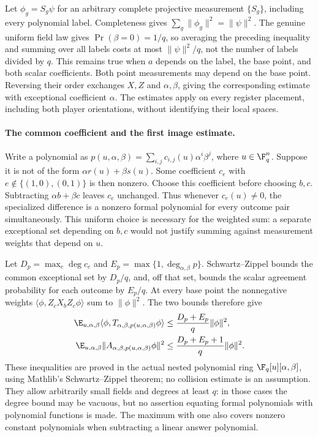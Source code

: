 \documentclass[11pt]{article}
\begin{document}
Let $\phi_g=S_g\psi$ for an arbitrary complete projective measurement
$\{S_g\}$, including every polynomial label. Completeness gives
$\sum_g\|\phi_g\|^2=\|\psi\|^2$. The genuine uniform field law gives
$\Pr(\beta=0)=1/q$, so averaging the preceding inequality and summing
over all labels costs at most $\|\psi\|^2/q$, not the number of labels
divided by $q$. This remains true when $a$ depends on the label, the
base point, and both scalar coefficients. Both point measurements may
depend on the base point. Reversing their order exchanges $X,Z$ and
$\alpha,\beta$, giving the corresponding estimate with exceptional
coefficient $\alpha$. The estimates apply on every register placement,
including both player orientations, without identifying their local spaces.

\paragraph{The common coefficient and the first image estimate.}
Write a polynomial as
$p(u,\alpha,\beta)=\sum_{i,j}c_{i,j}(u)\alpha^i\beta^j$,
where $u\in\F_q^n$. Suppose it is not of the form
$\alpha r(u)+\beta s(u)$. Some coefficient $c_e$ with
$e\notin\{(1,0),(0,1)\}$ is then nonzero. Choose this coefficient
before choosing $b,c$. Subtracting $\alpha b+\beta c$ leaves $c_e$
unchanged. Thus whenever $c_e(u)\ne0$, the specialized difference is
a nonzero formal polynomial for every outcome pair simultaneously.
This uniform choice is necessary for the weighted sum: a separate
exceptional set depending on $b,c$ would not justify summing against
measurement weights that depend on $u$.

Let $D_p=\max_e\deg c_e$ and
$E_p=\max\{1,\deg_{\alpha,\beta}p\}$. Schwartz--Zippel bounds the
common exceptional set by $D_p/q$, and, off that set, bounds the scalar
agreement probability for each outcome by $E_p/q$. At every base point
the nonnegative weights
$\langle\phi,Z_cX_bZ_c\phi\rangle$ sum to $\|\phi\|^2$.
The two bounds therefore give
\begin{align*}
 \E_{u,\alpha,\beta}
  \langle\phi,T_{\alpha,\beta,p(u,\alpha,\beta)}\phi\rangle
 &\leq \frac{D_p+E_p}{q}\|\phi\|^2, \\
 \E_{u,\alpha,\beta}
  \|A_{\alpha,\beta,p(u,\alpha,\beta)}\phi\|^2
 &\leq \frac{D_p+E_p+1}{q}\|\phi\|^2.
\end{align*}
These inequalities are proved in the actual nested polynomial ring
$\F_q[u][\alpha,\beta]$, using Mathlib's Schwartz--Zippel theorem;
no collision estimate is an assumption. They allow arbitrarily small
fields and degrees at least $q$: in those cases the degree bound may
be vacuous, but no assertion equating formal polynomials with polynomial
functions is made. The maximum with one also covers nonzero constant
polynomials when subtracting a linear answer polynomial.
\end{document}
